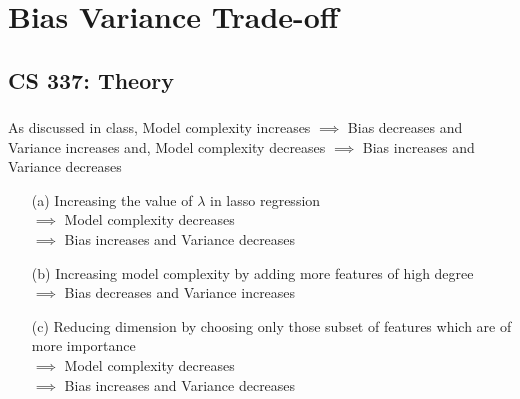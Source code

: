 \documentclass[12pt, fleqn]{article}
\begin{document}
\newpage
\section{Bias Variance Trade-off}
\subsection{CS 337: Theory}
\subsubsection{}
As discussed in class, Model complexity increases $\implies$ Bias decreases and Variance increases and, Model complexity decreases $\implies$ Bias increases and Variance decreases
\begin{enumerate}
  \item[(a)] Increasing the value of $\lambda$ in lasso regression \\
        $\implies$ Model complexity decreases \\
        $\implies$ Bias increases and Variance decreases
  \item[(b)] Increasing model complexity by adding more features of high degree \\
        $\implies$ Bias decreases and Variance increases
  \item[(c)] Reducing dimension by choosing only those subset of features which are of more importance \\
        $\implies$ Model complexity decreases \\
        $\implies$ Bias increases and Variance decreases
\end{enumerate}
\end{document}
